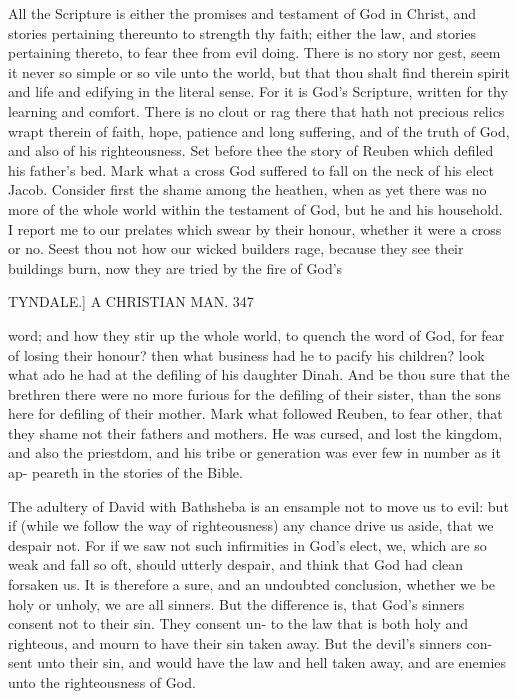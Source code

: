 \documentclass{custom}
\begin{document}
{All the Scripture is either the promises and testament of 
God in Christ, and stories pertaining thereunto to strength 
thy faith; either the law, and stories pertaining thereto, to 
fear thee from evil doing. There is no story nor gest, seem it 
never so simple or so vile unto the world, but that thou 
shalt find therein spirit and life and edifying in the literal 
sense. For it is God's Scripture, written for thy learning 
and comfort. There is no clout or rag there that hath not 
precious relics wrapt therein of faith, hope, patience and 
long suffering, and of the truth of God, and also of his 
righteousness. Set before thee the story of Reuben which 
defiled his father's bed. Mark what a cross God suffered 
to fall on the neck of his elect Jacob. Consider first the 
shame among the heathen, when as yet there was no more 
of the whole world within the testament of God, but he and 
his household. I report me to our prelates which swear 
by their honour, whether it were a cross or no. Seest 
thou not how our wicked builders rage, because they see 
their buildings burn, now they are tried by the fire of God's 


TYNDALE.] A CHRISTIAN MAN. 347

word; and how they stir up the whole world, to quench the 
word of God, for fear of losing their honour? then what 
business had he to pacify his children? look what ado he 
had at the defiling of his daughter Dinah. And be thou 
sure that the brethren there were no more furious for the 
defiling of their sister, than the sons here for defiling of 
their mother. Mark what followed Reuben, to fear other, 
that they shame not their fathers and mothers. He was 
cursed, and lost the kingdom, and also the priestdom, and 
his tribe or generation was ever few in number as it ap- 
peareth in the stories of the Bible. 

The adultery of David with Bathsheba is an ensample 
not to move us to evil: but if (while we follow the way of 
righteousness) any chance drive us aside, that we despair 
not. For if we saw not such infirmities in God's elect, we, 
which are so weak and fall so oft, should utterly despair, 
and think that God had clean forsaken us. It is therefore 
a sure, and an undoubted conclusion, whether we be holy 
or unholy, we are all sinners. But the difference is, that 
God's sinners consent not to their sin. They consent un- 
to the law that is both holy and righteous, and mourn to 
have their sin taken away. But the devil's sinners con- 
sent unto their sin, and would have the law and hell taken 
away, and are enemies unto the righteousness of God. 

}
\end{document}

